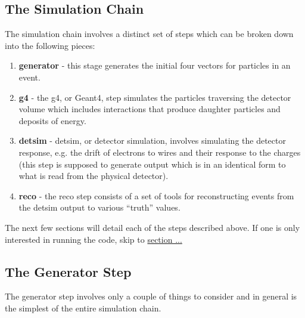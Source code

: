 \documentclass[8pt]{refart}
\begin{document}
\subsection{The Simulation Chain}
The simulation chain involves a distinct set of steps which can be broken down into the following pieces:
\begin{enumerate}
    \item \textbf{generator} - this stage generates the initial four vectors for particles in an event.
    \item \textbf{g4} - the g4, or Geant4, step simulates the particles traversing the detector volume which includes interactions that produce daughter particles and deposits of energy.
    \item \textbf{detsim} - detsim, or detector simulation, involves simulating the detector response, e.g. the drift of electrons to wires and their response to the charges (this step is supposed to generate output which is in an identical form to what is read from the physical detector).
    \item \textbf{reco} - the reco step consists of a set of tools for reconstructing events from the detsim output to various ``truth'' values.
\end{enumerate}
The next few sections will detail each of the steps described above.  If one is only interested in running the code, skip to \hyperref[runningthecode]{section ...}  


\subsection{The Generator Step}
The generator step involves only a couple of things to consider and in general is the simplest of the entire simulation chain.
\end{document}
